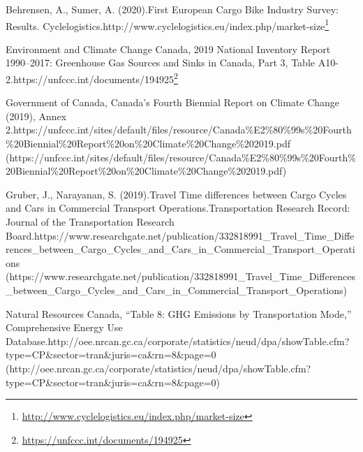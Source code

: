 \documentclass[letter]{ourGreenwayBrand}
\begin{document}
Behrensen, A., Sumer, A. (2020).First European Cargo Bike Industry Survey: Results. Cyclelogistics.http://www.cyclelogistics.eu/index.php/market-size\footnote{\url{http://www.cyclelogistics.eu/index.php/market-size}}

Environment and Climate Change Canada, 2019 National Inventory Report 1990–2017: Greenhouse Gas Sources and Sinks in Canada, Part 3, Table A10-2.https://unfccc.int/documents/194925\footnote{\url{https://unfccc.int/documents/194925}}

Government of Canada, Canada’s Fourth Biennial Report on Climate Change (2019), Annex 2.https://unfccc.int/sites/default/files/resource/Canada\%E2\%80\%99s\%20Fourth\%20Biennial\%20Report\%20on\%20Climate\%20Change\%202019.pdf (https://unfccc.int/sites/default/files/resource/Canada\%E2\%80\%99s\%20Fourth\%20Biennial\%20Report\%20on\%20Climate\%20Change\%202019.pdf)

Gruber, J., Narayanan, S. (2019).Travel Time differences between Cargo Cycles and Cars in Commercial Transport Operations.Transportation Research Record: Journal of the Transportation Research Board.https://www.researchgate.net/publication/332818991\_Travel\_Time\_Differences\_between\_Cargo\_Cycles\_and\_Cars\_in\_Commercial\_Transport\_Operations (https://www.researchgate.net/publication/332818991\_Travel\_Time\_Differences\_between\_Cargo\_Cycles\_and\_Cars\_in\_Commercial\_Transport\_Operations)

Natural Resources Canada, “Table 8: GHG Emissions by Transportation Mode,” Comprehensive Energy Use Database.http://oee.nrcan.gc.ca/corporate/statistics/neud/dpa/showTable.cfm?type=CP\&sector=tran\&juris=ca\&rn=8\&page=0 (http://oee.nrcan.gc.ca/corporate/statistics/neud/dpa/showTable.cfm?type=CP\&sector=tran\&juris=ca\&rn=8\&page=0)

\vspace{2em}
\end{document}
